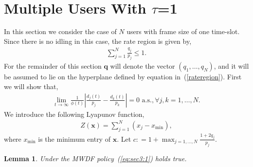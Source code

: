 \documentclass[letterpaper, 10 pt, conference]{ieeeconf}
\newtheorem{lemma}{Lemma}
\begin{document}
\section{Multiple Users With $\tau $=1}\label{sec5}
In this section we consider the case of $N$ users with frame size of one time-slot.
Since there is no idling in this case, the rate region is given by,
\begin{align}\label{rateregion}
\sum_{j=1}^{N}\frac{q_{j}}{p_{j}} \leq 1.
\end{align}
For the remainder of this section $\bm{q}$ will denote the vector $(q_{1},\ldots,q_{N}  )$, and it will be assumed to lie on the hyperplane defined by equation in~(\ref{rateregion}). First we will show that, 
\begin{align}\label{eq:sec3:1}
\lim_{t\to\infty}  \frac{1}{\phi(t)}\left|\frac{d_{j}(t)}{p_{j}}-\frac{d_{k}(t)}{p_{k}}\right| = 0\mbox{ a.s.},\forall j,k= 1,\ldots,N. 
\end{align}
We introduce the following Lyapunov function,
\begin{align}\label{sec:3:lyapunov}
Z(\bm{x}) = \sum_{j=1}^{N}(x_{j}-x_{\min}),
\end{align}
where $x_{\min}$ is the minimum entry of $\bm{x}$. Let $c: = 1+ \max_{j=1,\ldots,N} \frac{1+2q_{j}}{p_{j}} $.
\begin{lemma}\label{sec:3:lemma1}
 Under the MWDF policy~(\ref{eq:sec3:1}) holds true.
\end{lemma} 
\end{document}
